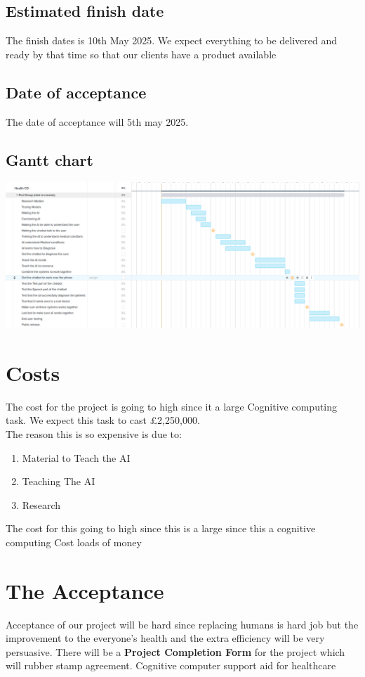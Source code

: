 \documentclass{article}
\begin{document}
\subsection{Estimated finish date}

The finish dates is 10th May 2025. We expect everything to be delivered and ready by that time so that our clients have a product available 

\subsection{Date of acceptance}
The date of acceptance will 5th may 2025.  

\subsection{Gantt chart}
\includegraphics[scale=0.25]{gantt}






\section{Costs}
The cost for the project is going to high since it a large Cognitive computing task. We expect this task to cast £2,250,000. \\
The reason this is so expensive is due to:
\begin{enumerate}
	\item Material to Teach the AI
	\item Teaching The AI
	\item Research 
\end{enumerate}
The cost for this going to high since this is a large since this a cognitive computing 
Cost loads of money

\section{The Acceptance}
Acceptance of our project will be hard since replacing humans is hard job but the improvement to the everyone's health and the extra efficiency will be very persuasive. There will be a \textbf{Project Completion Form} for the project which will rubber stamp agreement.
Cognitive computer support aid for healthcare
\end{document}
